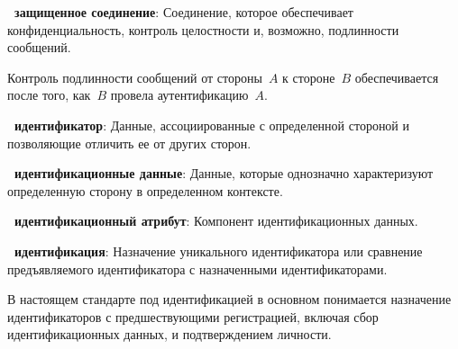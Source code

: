 {\bf \thedefctr~защищенное соединение}: %
Соединение, которое обеспечивает конфиденциальность, контроль целостности и,
возможно, подлинности сообщений.

\begin{note*}
Контроль подлинности сообщений от стороны~$A$ к стороне~$B$ обеспечивается после
того, как~$B$ провела аутентификацию~$A$.
\end{note*}

{\bf \thedefctr~идентификатор}:
Данные, ассоциированные с определенной стороной и позволяющие отличить ее от
других сторон.





{\bf \thedefctr~идентификационные данные}:
Данные, которые однозначно характеризуют определенную сторону в определенном 
контексте.



{\bf \thedefctr~идентификационный атрибут}:
Компонент идентификационных данных.

{\bf \thedefctr~идентификация}: %
Назначение уникального идентификатора или сравнение предъявляемого
идентификатора с назначенными идентификаторами.

\begin{note*}
В настоящем стандарте под идентификацией в основном понимается назначение
идентификаторов с предшествующими регистрацией, включая сбор идентификационных 
данных, и подтверждением личности.
\end{note*}

